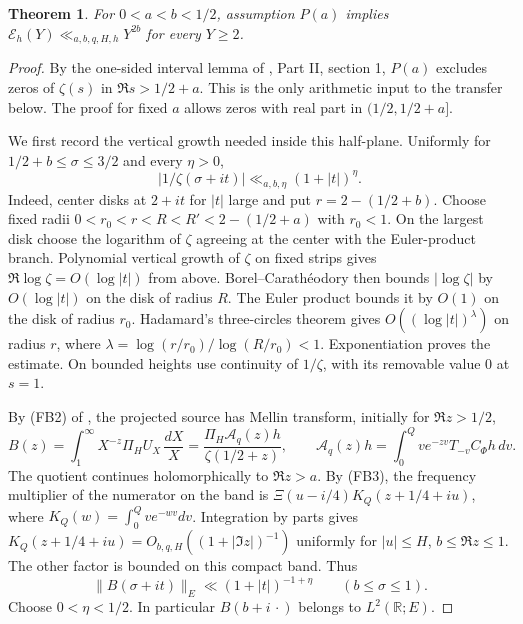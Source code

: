 \documentclass[11pt]{article}
\newtheorem{theorem}{Theorem}
\newcommand{\E}{\mathcal E}
\begin{document}
\begin{theorem}
For $0<a<b<1/2$, assumption $P(a)$ implies
$\E_h(Y)\ll_{a,b,q,H,h}Y^{2b}$ for every $Y\ge2$.
\end{theorem}

\begin{proof}
By the one-sided interval lemma of \cite{guide}, Part II, section 1, $P(a)$ excludes zeros of $\zeta(s)$ in $\Re s>1/2+a$. This is the only arithmetic input to the transfer below. The proof for fixed $a$ allows zeros with real part in $(1/2,1/2+a]$.

We first record the vertical growth needed inside this half-plane. Uniformly for $1/2+b\le \sigma\le 3/2$ and every $\eta>0$,
\[
 |1/\zeta(\sigma+it)|\ll_{a,b,\eta}(1+|t|)^\eta .
\]
Indeed, center disks at $2+it$ for $|t|$ large and put $r=2-(1/2+b)$. Choose fixed radii $0<r_0<r<R<R'<2-(1/2+a)$ with $r_0<1$. On the largest disk choose the logarithm of $\zeta$ agreeing at the center with the Euler-product branch. Polynomial vertical growth of $\zeta$ on fixed strips gives $\Re\log\zeta=O(\log |t|)$ from above. Borel--Carath\'eodory then bounds $|\log\zeta|$ by $O(\log |t|)$ on the disk of radius $R$. The Euler product bounds it by $O(1)$ on the disk of radius $r_0$. Hadamard's three-circles theorem gives $O((\log |t|)^\lambda)$ on radius $r$, where $\lambda=\log(r/r_0)/\log(R/r_0)<1$. Exponentiation proves the estimate. On bounded heights use continuity of $1/\zeta$, with its removable value $0$ at $s=1$.

By (FB2) of \cite{original}, the projected source has Mellin transform, initially for $\Re z>1/2$,
\[
 B(z)=\int_1^\infty X^{-z}\Pi_H U_X\,\frac{dX}{X}
     =\frac{\Pi_H\mathcal A_q(z)h}{\zeta(1/2+z)},\qquad
 \mathcal A_q(z)h=\int_0^Q v e^{-zv}T_{-v}C_\Phi h\,dv.
\]
The quotient continues holomorphically to $\Re z>a$. By (FB3), the frequency multiplier of the numerator on the band is
$\Xi(u-i/4)K_Q(z+1/4+iu)$, where $K_Q(w)=\int_0^Q v e^{-wv}dv$.
Integration by parts gives $K_Q(z+1/4+iu)=O_{b,q,H}((1+|\Im z|)^{-1})$ uniformly for $|u|\le H$, $b\le\Re z\le1$. The other factor is bounded on this compact band. Thus
\[
 \|B(\sigma+it)\|_E\ll (1+|t|)^{-1+\eta}\qquad(b\le\sigma\le1).
\]
Choose $0<\eta<1/2$. In particular $B(b+i\,\cdot)$ belongs to $L^2(\mathbb R;E)$.


\end{proof}
\end{document}
